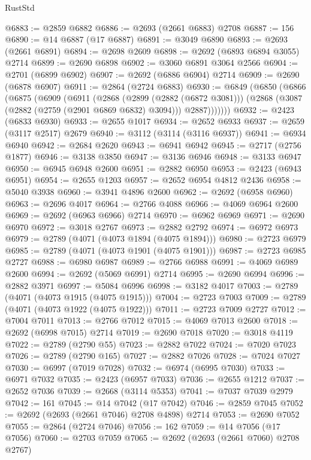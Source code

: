\begin{lexlean}{RustStd}
\begin{coremodule}
@6883 := @2859 @6882
@6886 := @2693 (@2661 @6883) @2708
@6887 := 156
@6890 := @14 @6887 (@17 @6887)
@6891 := @3049 @6890
@6893 := @2693 (@2661 @6891)
@6894 := @2698 @2609
@6898 := @2692 (@6893 @6894 @3055) @2714
@6899 := @2690 @6898
@6902 := @3060 @6891 @3064 @2566
@6904 := @2701 (@6899 @6902)
@6907 := @2692 (@6886 @6904) @2714
@6909 := @2690 (@6878 @6907)
@6911 := @2864 (@2724 @6883)
@6930 := @6849
    (@6850
      (@6866
        (@6875
          (@6909
            (@6911
              (@2868
                (@2899 (@2882 (@6872 @3081)))
                (@2868 (@3087 (@2882 (@2759 (@2901 @6869 @6832) @3094))) @2887)))))))
@6932 := @2423 (@6833 @6930)
@6933 := @2655 @1017
@6934 := @2652 @6933
@6937 := @2659 (@3117 @2517) @2679
@6940 := @3112 (@3114 (@3116 @6937))
@6941 := @6934 @6940
@6942 := @2684 @2620
@6943 := @6941 @6942
@6945 := @2717 (@2756 @1877)
@6946 := @3138 @3850
@6947 := @3136 @6946
@6948 := @3133 @6947
@6950 := @6945 @6948 @2600
@6951 := @2882 @6950
@6953 := @2423 (@6943 @6951)
@6954 := @2655 @1203
@6957 := @2652 @6954 @4812 @2436
@6958 := @5040 @3938
@6960 := @3941 @4896 @2600
@6962 := @2692 (@6958 @6960)
@6963 := @2696 @4017
@6964 := @2766 @4088
@6966 := @4069 @6964 @2600
@6969 := @2692 (@6963 @6966) @2714
@6970 := @6962 @6969
@6971 := @2690 @6970
@6972 := @3018 @2767
@6973 := @2882 @2792
@6974 := @6972 @6973
@6979 := @2789 (@4071 (@4073 @1894 (@4075 @1894)))
@6980 := @2723 @6979
@6985 := @2789 (@4071 (@4073 @1901 (@4075 @1901)))
@6987 := @2723 @6985 @2727
@6988 := @6980 @6987
@6989 := @2766 @6988
@6991 := @4069 @6989 @2600
@6994 := @2692 (@5069 @6991) @2714
@6995 := @2690 @6994
@6996 := @2882 @3971
@6997 := @5084 @6996
@6998 := @3182 @4017
@7003 := @2789 (@4071 (@4073 @1915 (@4075 @1915)))
@7004 := @2723 @7003
@7009 := @2789 (@4071 (@4073 @1922 (@4075 @1922)))
@7011 := @2723 @7009 @2727
@7012 := @7004 @7011
@7013 := @2766 @7012
@7015 := @4069 @7013 @2600
@7018 := @2692 (@6998 @7015) @2714
@7019 := @2690 @7018
@7020 := @3018 @4119
@7022 := @2789 (@2790 @55)
@7023 := @2882 @7022
@7024 := @7020 @7023
@7026 := @2789 (@2790 @165)
@7027 := @2882 @7026
@7028 := @7024 @7027
@7030 := @6997 (@7019 @7028)
@7032 := @6974 (@6995 @7030)
@7033 := @6971 @7032
@7035 := @2423 (@6957 @7033)
@7036 := @2655 @1212
@7037 := @2652 @7036
@7039 := @2668 (@3114 @5353)
@7041 := @7037 @7039 @2979
@7042 := 161
@7045 := @14 @7042 (@17 @7042)
@7046 := @2859 @7045
@7052 := @2692 (@2693 (@2661 @7046) @2708 @4898) @2714
@7053 := @2690 @7052
@7055 := @2864 (@2724 @7046)
@7056 := 162
@7059 := @14 @7056 (@17 @7056)
@7060 := @2703 @7059
@7065 := @2692 (@2693 (@2661 @7060) @2708 @2767)

\end{coremodule}
\end{lexlean}
